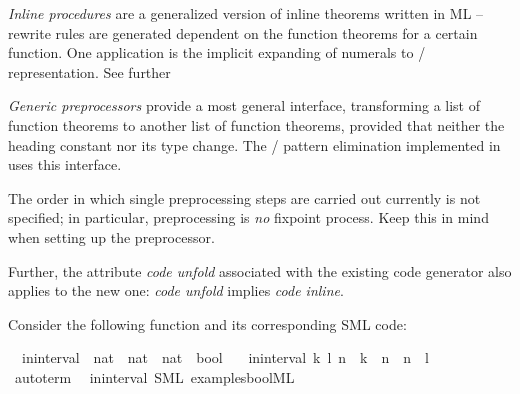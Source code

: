 \begin{isabellebody}
\begin{isamarkuptext}
  \emph{Inline procedures} are a generalized version of inline
  theorems written in ML -- rewrite rules are generated dependent
  on the function theorems for a certain function.  One
  application is the implicit expanding of  numerals
  to  /  representation.  See further

  \emph{Generic preprocessors} provide a most general interface,
  transforming a list of function theorems to another
  list of function theorems, provided that neither the heading
  constant nor its type change.  The  / 
  pattern elimination implemented in  uses this
  interface.

  \begin{warn}
    The order in which single preprocessing steps are carried
    out currently is not specified; in particular, preprocessing
    is \emph{no} fixpoint process.  Keep this in mind when
    setting up the preprocessor.

    Further, the attribute \emph{code unfold}
    associated with the existing code generator also applies to
    the new one: \emph{code unfold} implies \emph{code inline}.
  \end{warn}%
\end{isamarkuptext}%
\isamarkuptrue%
%
\isamarkuptrue%
%
\begin{isamarkuptext}%
Consider the following function and its corresponding
  SML code:%
\end{isamarkuptext}%
\isamarkuptrue%
\isamarkupfalse%
\isanewline
\ \ in{\isacharunderscore}interval\ {\isacharcolon}{\isacharcolon}\ {\isachardoublequoteopen}nat\ {\isasymtimes}\ nat\ {\isasymRightarrow}\ nat\ {\isasymRightarrow}\ bool{\isachardoublequoteclose}\ \isanewline
\ \ {\isachardoublequoteopen}in{\isacharunderscore}interval\ {\isacharparenleft}k{\isacharcomma}\ l{\isacharparenright}\ n\ {\isasymlongleftrightarrow}\ k\ {\isasymle}\ n\ {\isasymand}\ n\ {\isasymle}\ l{\isachardoublequoteclose}\isanewline
{}\isamarkupfalse%
%
\isadelimproof
\ %
\endisadelimproof
%
\isatagproof
{}\isamarkupfalse%
\ {\isacharparenleft}auto{\isacharunderscore}term\ {\isachardoublequoteopen}{\isacharbraceleft}{\isacharbraceright}{\isachardoublequoteclose}{\isacharparenright}%
\endisatagproof
{\isafoldproof}%
%
\isadelimproof
%
\endisadelimproof
\isanewline
{}\isamarkupfalse%
\ in{\isacharunderscore}interval\ {\isacharparenleft}SML\ {\isachardoublequoteopen}examples{\isacharslash}bool{}{\isachardot}ML{\isachardoublequoteclose}{\isacharparenright}%
\begin{isamarkuptext}%


\end{isamarkuptext}
\end{isabellebody}
